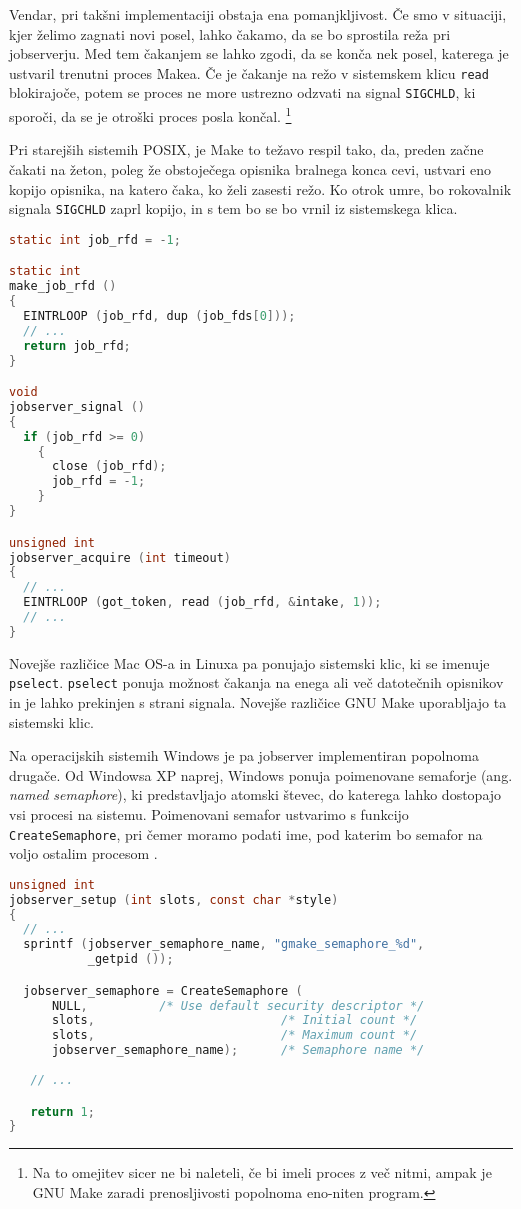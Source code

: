\documentclass[notitlepage]{report}
\begin{document}
Vendar, pri takšni implementaciji obstaja ena pomanjkljivost. Če smo v
situaciji, kjer želimo zagnati novi posel, lahko čakamo, da se bo
sprostila reža pri jobserverju. Med tem čakanjem se lahko zgodi, da se
konča nek posel, katerega je ustvaril trenutni proces Makea. Če je
čakanje na režo v sistemskem klicu \verb|read| blokirajoče, potem se
proces ne more ustrezno odzvati na signal \verb|SIGCHLD|, ki sporoči,
da se je otroški proces posla končal. \footnote{Na to omejitev sicer
  ne bi naleteli, če bi imeli proces z več nitmi, ampak je GNU Make
  zaradi prenosljivosti popolnoma eno-niten program.}

Pri starejših sistemih POSIX, je Make to težavo respil tako, da,
preden začne čakati na žeton, poleg že obstoječega opisnika bralnega
konca cevi, ustvari eno kopijo opisnika, na katero čaka, ko želi
zasesti režo. Ko otrok umre, bo rokovalnik signala \verb|SIGCHLD|
zaprl kopijo, in s tem bo se bo vrnil iz sistemskega klica.

\begin{lstlisting}[language=C, basicstyle=\sffamily]
static int job_rfd = -1;

static int
make_job_rfd ()
{
  EINTRLOOP (job_rfd, dup (job_fds[0]));
  // ...
  return job_rfd;
}

void
jobserver_signal ()
{
  if (job_rfd >= 0)
    {
      close (job_rfd);
      job_rfd = -1;
    }
}

unsigned int
jobserver_acquire (int timeout)
{
  // ...
  EINTRLOOP (got_token, read (job_rfd, &intake, 1));
  // ...
}
\end{lstlisting}

Novejše različice Mac OS-a in Linuxa pa ponujajo sistemski klic, ki se
imenuje \verb|pselect|. \verb|pselect| ponuja možnost čakanja na enega
ali več datotečnih opisnikov in je lahko prekinjen s strani
signala. Novejše različice GNU Make uporabljajo ta sistemski klic.

Na operacijskih sistemih Windows je pa jobserver implementiran
popolnoma drugače. Od Windowsa XP naprej, Windows ponuja poimenovane
semaforje (ang. \textit{named semaphore}), ki predstavljajo atomski
števec, do katerega lahko dostopajo vsi procesi na
sistemu. Poimenovani semafor ustvarimo s funkcijo
\verb|CreateSemaphore|, pri čemer moramo podati ime, pod katerim bo
semafor na voljo ostalim procesom \cite{ms-semaphore}.

\begin{lstlisting}[language=C, basicstyle=\sffamily]
unsigned int
jobserver_setup (int slots, const char *style)
{
  // ...
  sprintf (jobserver_semaphore_name, "gmake_semaphore_%d",
           _getpid ());

  jobserver_semaphore = CreateSemaphore (
      NULL,          /* Use default security descriptor */
      slots,                          /* Initial count */
      slots,                          /* Maximum count */
      jobserver_semaphore_name);      /* Semaphore name */
      
   // ...

   return 1;   
}      
\end{lstlisting}
\end{document}
